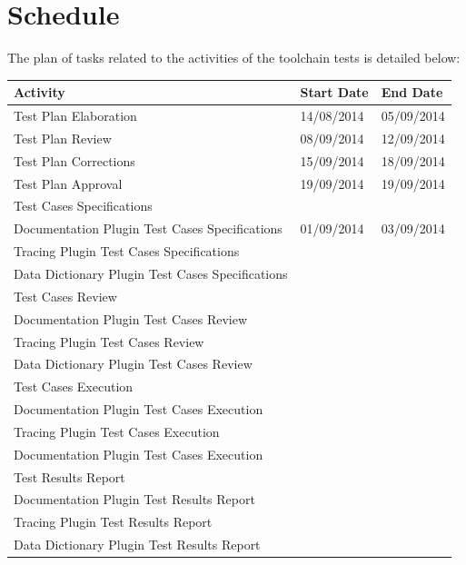 \section{Schedule}
The plan of tasks related to the activities of the toolchain tests is detailed below:
\begin{table}[H]
\centering
\begin{tabular}{|p{8cm}|p{3cm}|p{3cm}|}\hline
\textbf{Activity} & \textbf{Start Date} & \textbf{End Date}\\\hline
Test Plan Elaboration & 14/08/2014 & 05/09/2014 \\\hline
Test Plan Review & 08/09/2014 & 12/09/2014\\\hline
Test Plan Corrections & 15/09/2014 & 18/09/2014\\\hline
Test Plan Approval & 19/09/2014 & 19/09/2014\\\hline
\multicolumn{3}{|l|}{Test Cases Specifications}\\\hline
Documentation Plugin Test Cases Specifications & 01/09/2014 & 03/09/2014\\\hline
Tracing Plugin Test Cases Specifications & & \\\hline
Data Dictionary Plugin Test Cases Specifications & & \\\hline
\multicolumn{3}{|l|}{Test Cases Review}\\\hline
Documentation Plugin Test Cases Review & & \\\hline
Tracing Plugin Test Cases Review & & \\\hline
Data Dictionary Plugin Test Cases Review & & \\\hline
\multicolumn{3}{|l|}{Test Cases Execution}\\\hline
Documentation Plugin Test Cases Execution & & \\\hline
Tracing Plugin Test Cases Execution & & \\\hline
Documentation Plugin Test Cases Execution & & \\\hline
\multicolumn{3}{|l|}{Test Results Report}\\\hline
Documentation Plugin Test Results Report & & \\\hline
Tracing Plugin Test Results Report & & \\\hline
Data Dictionary Plugin Test Results Report & & \\\hline
\end{tabular}
\end{table}

